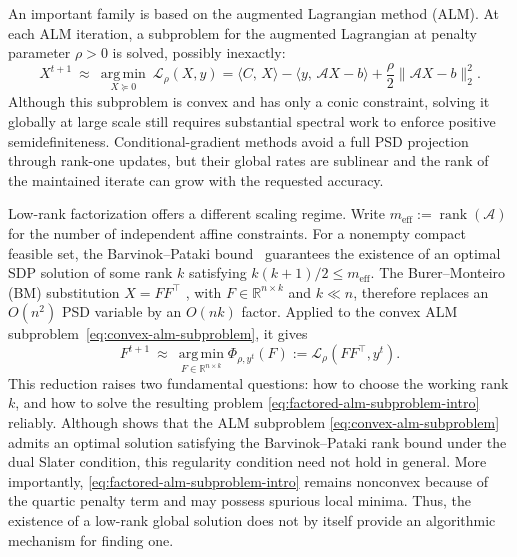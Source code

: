 \documentclass[11pt]{article}
\theoremstyle{definition}
\theoremstyle{remark}
\newcommand{\inner}[2]{\langle #1,\, #2\rangle}
\newcommand{\Aop}{\mathcal{A}}              %
\newcommand{\Cobj}{C}                       %
\newcommand{\bvec}{b}                       %
\newcommand{\Xvar}{X}                       %
\newcommand{\yvar}{y}                       %
\newcommand{\Lrho}{\mathcal{L}_{\rho}}      %
\begin{document}
An important family is based on the augmented Lagrangian method (ALM).
At each ALM iteration, a subproblem for the augmented Lagrangian at penalty
parameter $\rho>0$ is solved, possibly inexactly:
\begin{equation}
\Xvar^{t+1}\ \approx\
\operatorname*{arg\,min}_{\Xvar\succeq0}\ \Lrho(\Xvar,\yvar)
=\inner{\Cobj}{\Xvar}
-\inner{\yvar}{\Aop\Xvar-\bvec}
+\frac{\rho}{2}\bigl\lVert \Aop\Xvar-\bvec\bigr\rVert_{2}^{2}
.
\label{eq:convex-alm-subproblem}
\end{equation}
Although this subproblem is convex and has only a conic constraint, solving it
globally at large scale still requires substantial spectral work to enforce
positive semidefiniteness.  Conditional-gradient methods avoid a full PSD
projection through rank-one updates, but their global rates are sublinear and
the rank of the maintained iterate can grow with the requested accuracy.

Low-rank factorization offers a different scaling regime.  Write
$m_{\mathrm{eff}}:=\operatorname{rank}(\mathcal A)$ for the number of
independent affine constraints.  For a nonempty compact feasible set, the
Barvinok--Pataki bound~\cite{Barvinok1995,Pataki1998} guarantees the existence
of an optimal SDP solution of some rank $k$ satisfying
$k(k+1)/2\leq m_{\mathrm{eff}}$.
The Burer--Monteiro (BM) substitution $X=FF^\top$
\cite{BurerMonteiro2003}, with $F\in\mathbb R^{n\times k}$ and
$k\ll n$, therefore replaces an $O(n^2)$ PSD variable by an
$O(nk)$ factor.  Applied to the convex ALM
subproblem~\eqref{eq:convex-alm-subproblem}, it gives
\begin{equation}
    F^{t+1}
    \ \approx\
    \operatorname*{arg\,min}_{F\in\mathbb R^{n\times k}}
    \Phi_{\rho,y^t}(F):=\Lrho(FF^\top,y^t).
    \label{eq:factored-alm-subproblem-intro}
\end{equation}
This reduction raises two fundamental questions: how to choose the working
rank $k$, and how to solve the resulting problem
\eqref{eq:factored-alm-subproblem-intro} reliably.  Although
\cite[Proposition~2]{ALORA} shows that the ALM subproblem
\eqref{eq:convex-alm-subproblem} admits an optimal solution satisfying the
Barvinok--Pataki rank bound under the dual Slater condition, this regularity
condition need not hold in general.  More importantly,
\eqref{eq:factored-alm-subproblem-intro} remains
nonconvex because of the quartic penalty term and may possess spurious local
minima.  Thus, the existence of a low-rank global solution does not by itself
provide an algorithmic mechanism for finding one.
\end{document}
